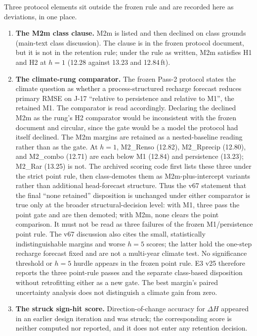 \documentclass[11pt]{article}
\begin{document}
Three protocol elements sit outside the frozen rule and are recorded here as deviations, in one place.
\begin{enumerate}[leftmargin=2em]
\item \textbf{The M2m class clause.} M2m is listed and then declined on class grounds (main-text class discussion). The clause is in the frozen protocol document, but it is not in the retention rule; under the rule as written, M2m satisfies H1 and H2 at $h=1$ (12.28 against 13.23 and 12.84\,ft).
\item \textbf{The climate-rung comparator.} The frozen Pass-2 protocol states the climate question as whether a process-structured recharge forecast reduces primary RMSE on J-17 ``relative to persistence and relative to M1'', the retained M1. The comparator is read accordingly. Declaring the declined M2m as the rung's H2 comparator would be inconsistent with the frozen document and circular, since the gate would be a model the protocol had itself declined. The M2m margins are retained as a nested-baseline reading rather than as the gate. At $h=1$, M2\_Renso (12.82), M2\_Rprecip (12.80), and M2\_combo (12.71) are each below M1 (12.84) and persistence (13.23); M2\_Rar (13.25) is not. The archived scoring code first lists these three under the strict point rule, then class-demotes them as M2m-plus-intercept variants rather than additional head-forecast structure. Thus the v67 statement that the final ``none retained'' disposition is unchanged under either comparator is true only at the broader structural-decision level: with M1, three pass the point gate and are then demoted; with M2m, none clears the point comparison. It must not be read as three failures of the frozen M1/persistence point rule. The v67 discussion also cites the small, statistically indistinguishable margins and worse $h=5$ scores; the latter hold the one-step recharge forecast fixed and are not a multi-year climate test. No significance threshold or $h=5$ hurdle appears in the frozen point rule. E3 v25 therefore reports the three point-rule passes and the separate class-based disposition without retrofitting either as a new gate. The best margin's paired uncertainty analysis does not distinguish a climate gain from zero.
\item \textbf{The struck sign-hit score.} Direction-of-change accuracy for $\Delta H$ appeared in an earlier design iteration and was struck; the corresponding score is neither computed nor reported, and it does not enter any retention decision.
\end{enumerate}
\end{document}
